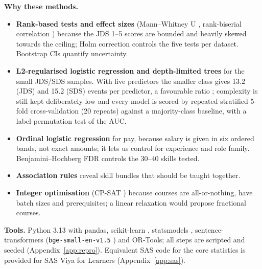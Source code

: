 \textbf{Why these methods.}
\begin{itemize}
  \item \textbf{Rank-based tests and effect sizes} (Mann--Whitney U \citep{mannwhitney1947},
        rank-biserial correlation \citep{kerby2014}) because the JDS 1--5 scores are bounded and
        heavily skewed towards the ceiling; Holm correction \citep{holm1979} controls the five
        tests per dataset. Bootstrap CIs \citep{efron1993} quantify uncertainty.
  \item \textbf{L2-regularised logistic regression and depth-limited trees} \citep{breiman1984}
        for the small JDS/SDS samples. With five predictors the smaller class gives 13.2 (JDS) and
        15.2 (SDS) events per predictor, a favourable ratio \citep{peduzzi1996,vittinghoff2007};
        complexity is still kept deliberately low and every model is scored by repeated stratified
        5-fold cross-validation (20 repeats) against a majority-class baseline, with a label-permutation
        test of the AUC.
  \item \textbf{Ordinal logistic regression} \citep{mccullagh1980} for pay, because salary is
        given in six ordered bands, not exact amounts; it lets us control for experience and role
        family. Benjamini--Hochberg FDR \citep{benjamini1995} controls the 30--40 skills tested.
  \item \textbf{Association rules} \citep{agrawal1994} reveal skill bundles that should be taught
        together.
  \item \textbf{Integer optimisation} (CP-SAT \citep{cpsat}) because courses are all-or-nothing,
        have batch sizes and prerequisites; a linear relaxation would propose fractional courses.
\end{itemize}

\textbf{Tools.} Python 3.13 with pandas, scikit-learn \citep{pedregosa2011}, statsmodels
\citep{seabold2010}, sentence-transformers \citep{reimers2019} (\texttt{bge-small-en-v1.5}
\citep{xiao2023bge}) and OR-Tools; all steps are scripted and seeded
(Appendix~\ref{app:repro}). Equivalent SAS code for the core statistics is provided for SAS Viya
for Learners \citep{sasvfl} (Appendix~\ref{app:sas}).
